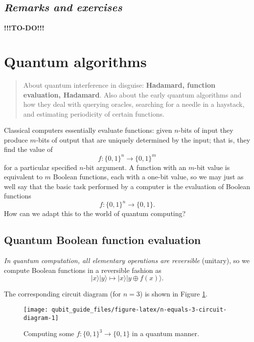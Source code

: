 \documentclass[fleqn]{article}
\let\oldsection\section
\renewcommand\section{\clearpage\oldsection}
\begin{document}
\hypertarget{remarks-and-exercises-9}{%
\subsection{\texorpdfstring{\emph{Remarks and exercises}}{Remarks and exercises}}\label{remarks-and-exercises-9}}

\textbf{!!!TO-DO!!!}

\hypertarget{quantum-algorithms}{%
\section{Quantum algorithms}\label{quantum-algorithms}}

\begin{quote}
About quantum interference in disguise: \textbf{Hadamard, function evaluation, Hadamard}.
Also about the early quantum algorithms and how they deal with querying oracles, searching for a needle in a haystack, and estimating periodicity of certain functions.
\end{quote}

Classical computers essentially evaluate functions: given \(n\)-bits of input they produce \(m\)-bits of output that are uniquely determined by the input; that is, they find the value of
\[
  f\colon \{0,1\}^n \to \{0,1\}^m
\]
for a particular specified \(n\)-bit argument.
A function with an \(m\)-bit value is equivalent to \(m\) Boolean functions, each with a one-bit value, so we may just as well say that the basic task performed by a computer is the evaluation of Boolean functions
\[
  f\colon \{0,1\}^n \to  \{0,1\}.
\]
How can we adapt this to the world of quantum computing?

\hypertarget{quantum-boolean-function-evaluation}{%
\subsection{Quantum Boolean function evaluation}\label{quantum-boolean-function-evaluation}}

\emph{In quantum computation, all elementary operations are reversible} (unitary), so we compute Boolean functions in a reversible fashion as
\[
  |x\rangle|y\rangle \mapsto |x\rangle|y\oplus f(x)\rangle.
\]

The corresponding circuit diagram (for \(n=3\)) is shown in Figure \ref{fig:n-equals-3-circuit-diagram}.



\begin{figure}[H]

{\centering \texttt{[image: qubit\_guide\_files/figure-latex/n-equals-3-circuit-diagram-1]} 

}

\caption{Computing some \(f\colon\{0,1\}^3\to\{0,1\}\) in a quantum manner.}\label{fig:n-equals-3-circuit-diagram}
\end{figure}
\end{document}
